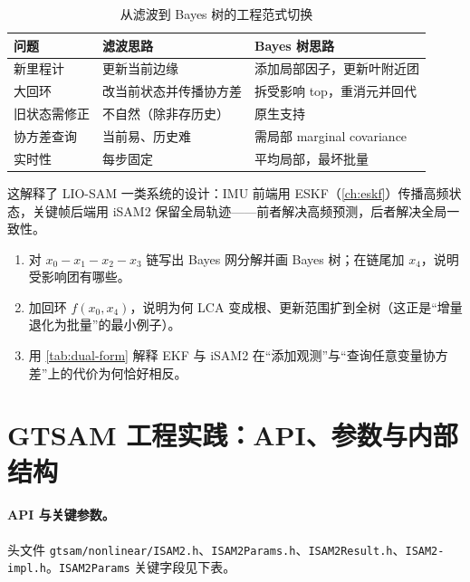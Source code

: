 \begin{table}[H]\centering\small
\caption{从滤波到 Bayes 树的工程范式切换}
\label{tab:paradigm}
\begin{tabular}{lll}
\toprule
问题 & 滤波思路 & Bayes 树思路 \\
\midrule
新里程计 & 更新当前边缘 & 添加局部因子，更新叶附近团 \\
大回环 & 改当前状态并传播协方差 & 拆受影响 top，重消元并回代 \\
旧状态需修正 & 不自然（除非存历史） & 原生支持 \\
协方差查询 & 当前易、历史难 & 需局部 marginal covariance \\
实时性 & 每步固定 & 平均局部，最坏批量 \\
\bottomrule
\end{tabular}
\end{table}

\noindent 这解释了 LIO-SAM 一类系统的设计：IMU 前端用 ESKF（\cref{ch:eskf}）传播高频状态，关键帧后端用 iSAM2 保留全局轨迹——前者解决高频预测，后者解决全局一致性。

\begin{practice}
\begin{enumerate}
  \item 对 $x_0-x_1-x_2-x_3$ 链写出 Bayes 网分解并画 Bayes 树；在链尾加 $x_4$，说明受影响团有哪些。
  \item 加回环 $f(x_0,x_4)$，说明为何 LCA 变成根、更新范围扩到全树（这正是“增量退化为批量”的最小例子）。
  \item 用 \cref{tab:dual-form} 解释 EKF 与 iSAM2 在“添加观测”与“查询任意变量协方差”上的代价为何恰好相反。
\end{enumerate}
\end{practice}

\section{GTSAM 工程实践：API、参数与内部结构}
\label{sec:isam-gtsam}

\paragraph{API 与关键参数。}
头文件 \texttt{gtsam/nonlinear/ISAM2.h}、\texttt{ISAM2Params.h}、\texttt{ISAM2Result.h}、\texttt{ISAM2-impl.h}。\texttt{ISAM2Params} 关键字段见下表。

